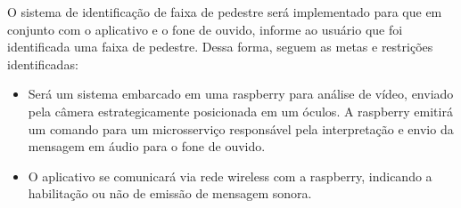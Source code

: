 O sistema de identificação de faixa de pedestre será implementado para que em conjunto com o aplicativo e o fone de ouvido, informe ao usuário que foi identificada uma faixa de pedestre. Dessa forma, seguem as metas e restrições identificadas:

\begin{itemize}
    \item Será um sistema embarcado em uma raspberry para análise de vídeo, enviado pela câmera estrategicamente posicionada em um óculos.  A raspberry emitirá um comando para um microsserviço responsável pela interpretação e envio da mensagem em áudio para o fone de ouvido.
    \item O aplicativo se comunicará via rede wireless com a raspberry, indicando a habilitação ou não de emissão de mensagem sonora.
\end{itemize}